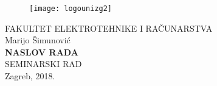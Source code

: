 \documentclass[12pt,oneside, a4paper]{article}
\numberwithin{equation}{section}
\renewcommand{\_}{\textscale{.7}{\textunderscore}}
\begin{document}
\begin{titlepage}
  \fontsize{16pt}{20pt}\selectfont
  \selectfont
  \setlength{\intextsep}{0pt plus 0pt minus 0pt}

  \begin{center}
    \begin{figure}[ht!]
      \begin{center}
        \texttt{[image: logo\_unizg2]}
      \end{center}
    \end{figure}		
    \vspace{0cm}
    {FAKULTET ELEKTROTEHNIKE I RAČUNARSTVA} \\
    \vspace{3cm}
    Marijo Šimunović \\
    \vspace{2cm}
    {\fontsize{22pt}{22pt}\selectfont\textbf{NASLOV RADA}} \\
    \vspace{2cm}    
    SEMINARSKI RAD \\
    \vspace{5cm}    %
    \vfill{Zagreb, 2018.}
  \end{center}
  \restoregeometry
\end{titlepage}

\tableofcontents
\clearpage
\listoffigures
\clearpage
\listoftables
\clearpage


\clearpage


\clearpage


\clearpage


\clearpage


\clearpage


\clearpage


\clearpage

 




\end{document}
